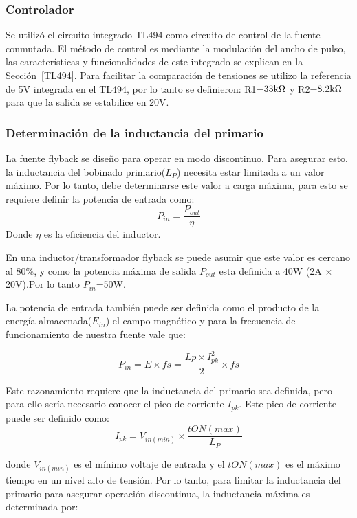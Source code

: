 \subsubsection{Controlador}

Se utilizó el circuito integrado TL494 como circuito de control de la fuente conmutada. El método de control es mediante la modulación del ancho de pulso, las características y funcionalidades de este integrado se explican en la Sección~\ref{TL494}. Para facilitar la comparación de tensiones se utilizo la referencia de 5V integrada en el TL494, por lo tanto se definieron: R1=$33\mbox{k}\Omega $ y R2=$8.2\mbox{k}\Omega$ para que la salida se estabilice en 20V.

\medskip
\subsubsection{Determinación de la inductancia del primario}

La fuente flyback se diseño para operar en modo discontinuo. Para asegurar esto, la 
inductancia del bobinado primario($L_P$) necesita estar limitada a un valor máximo.
Por lo tanto, debe determinarse este valor a carga máxima, para esto se requiere definir la
potencia de entrada como:
$$
P_{in}= \frac{P_{out}}{\eta}
$$
Donde $\eta$ es la eficiencia del inductor.

En una inductor/transformador flyback se puede asumir que este valor es cercano al $80\%$, y como la potencia máxima de salida $P_{out}$ esta definida a 40W (2A $\times$ 20V).Por lo tanto $P_{in}$=50W.

La potencia de entrada también puede ser definida como el producto de la energía almacenada($E_{in}$) el campo magnético y para la frecuencia de funcionamiento de nuestra fuente vale que:

\begin{equation}
P_{in}= E \times fs = \frac{Lp \times I_{pk}^2}{2} \times fs \label{potencia_entrada_L}
\end{equation}

Este razonamiento requiere que la inductancia del primario sea definida, pero para ello sería necesario conocer el pico de corriente $I_{pk}$. Este pico de corriente puede ser definido como:
$$
I_{pk}=V_{in(min)} \times \frac{t{ON(max)}}{L_P}
$$

donde $V_{in(min)}$ es el mínimo voltaje de entrada y el $t{ON(max)}$ es el máximo tiempo en un nivel alto de tensión. Por lo tanto, para limitar la inductancia del primario para asegurar operación discontinua, la inductancia máxima es determinada por:

